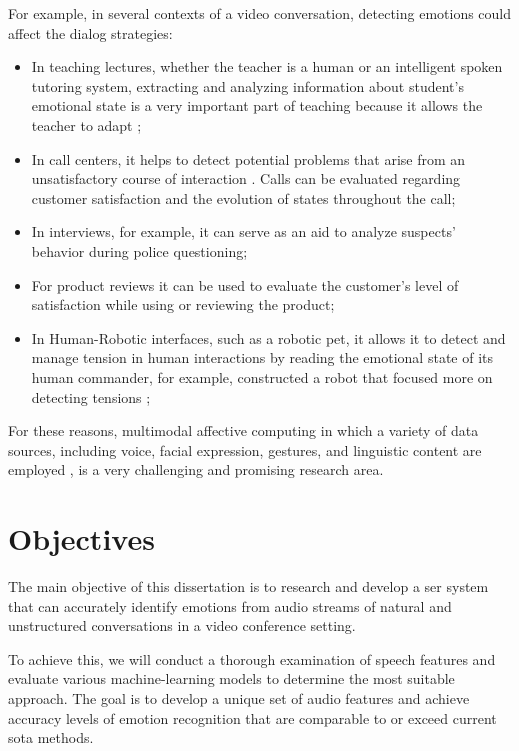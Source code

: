 For example, in several contexts of a video conversation, detecting emotions could affect the dialog strategies:
\begin{itemize}
    \item In teaching lectures, whether the teacher is a human or an intelligent spoken tutoring system, extracting and analyzing information about student's emotional state is a very important part of teaching because it allows the teacher to adapt \cite{teachexample};
    \item In call centers, it helps to detect potential problems that arise from an unsatisfactory course of interaction \cite{ccexample1, ccexample2, ccexample3}. Calls can be evaluated regarding customer satisfaction and the evolution of states throughout the call;
    \item In interviews, for example, it can serve as an aid to analyze suspects' behavior during police questioning;
    \item For product reviews it can be used to evaluate the customer's level of satisfaction while using or reviewing the product;
    \item In Human-Robotic interfaces, such as a robotic pet, it allows it to detect and manage tension in human interactions by reading the emotional state of its human commander, for example, \citeauthor{Kanda2005} constructed a robot that focused more on detecting tensions \cite{Kanda2005};
\end{itemize}

For these reasons, multimodal affective computing in which a variety of data sources, including voice, facial expression, gestures, and linguistic content are employed \cite{BALAZS201695}, is a very challenging and promising research area.


\section{Objectives}

The main objective of this dissertation is to research and develop a \ac{ser} system that can accurately identify emotions from audio streams of natural and unstructured conversations in a video conference setting.

To achieve this, we will conduct a thorough examination of speech features and evaluate various machine-learning models to determine the most suitable approach. The goal is to develop a unique set of audio features and achieve accuracy levels of emotion recognition that are comparable to or exceed current \ac{sota} methods.

